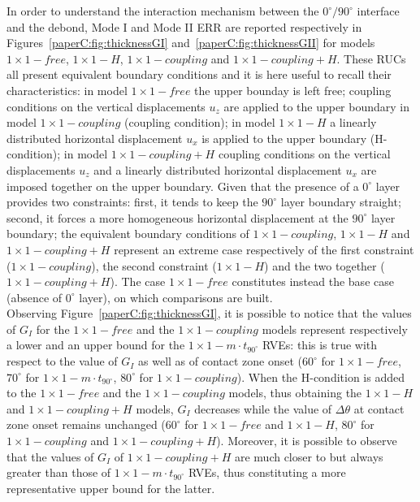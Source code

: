 In order to understand the interaction mechanism between the $0^{\circ}/90^{\circ}$ interface and the debond, Mode I and Mode II ERR are reported respectively in Figures~\ref{paperC:fig:thicknessGI} and~\ref{paperC:fig:thicknessGII} for models $1\times 1-free$, $1\times 1-H$, $1\times 1-coupling$ and $1\times 1-coupling+H$. These RUCs all present equivalent boundary conditions and it is here useful to recall their characteristics: in model $1\times 1-free$ the upper bounday is left free; coupling conditions on the vertical displacements $u_{z}$ are applied to the upper boundary in model $1\times 1-coupling$ (coupling condition); in model $1\times 1-H$ a linearly distributed horizontal displacement $u_{x}$ is applied to the upper boundary (H-condition); in model $1\times 1-coupling+H$ coupling conditions on the vertical displacements $u_{z}$ and a linearly distributed horizontal displacement $u_{x}$ are imposed together on the upper boundary. Given that the presence of a $0^{\circ}$ layer provides two constraints: first, it tends to keep the $90^{\circ}$ layer boundary straight; second, it forces a more homogeneous horizontal displacement at the $90^{\circ}$ layer boundary; the equivalent boundary conditions of $1\times 1-coupling$, $1\times 1-H$ and $1\times 1-coupling+H$ represent an extreme case respectively of the first constraint ($1\times 1-coupling$), the second constraint ($1\times 1-H$) and the two together ($1\times 1-coupling+H$). The case $1\times 1-free$ constitutes instead the base case (absence of $0^{\circ}$ layer), on which comparisons are built.\\
Observing Figure~\ref{paperC:fig:thicknessGI}, it is possible to notice that the values of $G_{I}$ for the $1\times 1-free$ and the $1\times 1-coupling$ models represent respectively a lower and an upper bound for the $1\times 1-m\cdot t_{90^{\circ}}$ RVEs: this is true with respect to the value of $G_{I}$ as well as of contact zone onset ($60^{\circ}$ for  $1\times 1-free$, $70^{\circ}$ for $1\times 1-m\cdot t_{90^{\circ}}$, $80^{\circ}$ for $1\times 1-coupling$). When the H-condition is added to the $1\times 1-free$ and the $1\times 1-coupling$ models, thus obtaining the $1\times 1-H$ and $1\times 1-coupling+H$ models, $G_{I}$ decreases while the value of $\Delta\theta$ at contact zone onset remains unchanged ($60^{\circ}$ for  $1\times 1-free$ and $1\times 1-H$, $80^{\circ}$ for $1\times 1-coupling$ and $1\times 1-coupling+H$). Moreover, it is possible to observe that the values of $G_{I}$ of $1\times 1-coupling+H$ are much closer to but always greater than those of $1\times 1-m\cdot t_{90^{\circ}}$ RVEs, thus constituting a more representative upper bound for the latter.\\
